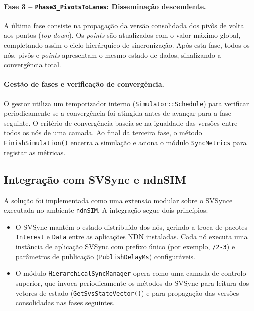 \paragraph{Fase 3 – \texttt{Phase3\_PivotsToLanes}: Disseminação descendente.}
A última fase consiste na propagação da versão consolidada dos pivôs de volta aos pontos (\textit{top-down}). Os \textit{points} são atualizados com o valor máximo global, completando assim o ciclo hierárquico de sincronização. Após esta fase, todos os nós, pivôs e  \textit{points} apresentam o mesmo estado de dados, sinalizando a convergência total.

\paragraph{Gestão de fases e verificação de convergência.}
O gestor utiliza um temporizador interno (\texttt{Simulator::\allowbreak Schedule}) para verificar periodicamente se a convergência foi atingida antes de avançar para a fase seguinte. O critério de convergência baseia-se na igualdade das versões entre todos os nós de uma camada. Ao final da terceira fase, o método \texttt{FinishSimulation()} encerra a simulação e aciona o módulo \texttt{SyncMetrics} para registar as métricas.

\subsection{Integração com \gls{SVSync} e ndnSIM}

A solução foi implementada como uma extensão modular sobre o \gls{SVSync}e executada no ambiente \texttt{ndnSIM}. A integração segue dois princípios:

\begin{itemize}
    \item O \gls{SVSync} mantém o estado distribuído dos nós, gerindo a troca de pacotes \texttt{Interest} e \texttt{Data} entre as aplicações \gls{NDN} instaladas. Cada nó executa uma instância de aplicação \gls{SVSync} com prefixo único (por exemplo, \texttt{/2-3}) e parâmetros de publicação (\texttt{PublishDelayMs}) configuráveis.
    \item O módulo \texttt{HierarchicalSyncManager} opera como uma camada de controlo superior, que invoca periodicamente os métodos do \gls{SVSync} para leitura dos vetores de estado (\texttt{GetSvsStateVector()}) e para propagação das versões consolidadas nas fases seguintes.
\end{itemize}

